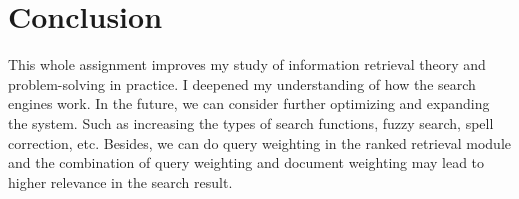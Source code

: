 \section{Conclusion}

This whole assignment improves my study of information retrieval theory and problem-solving in practice. I deepened my understanding of how the search engines work. In the future, we can consider further optimizing and expanding the system. Such as increasing the types of search functions, fuzzy search, spell correction, etc. Besides, we can do query weighting in the ranked retrieval module and the combination of query weighting and document weighting may lead to higher relevance in the search result.